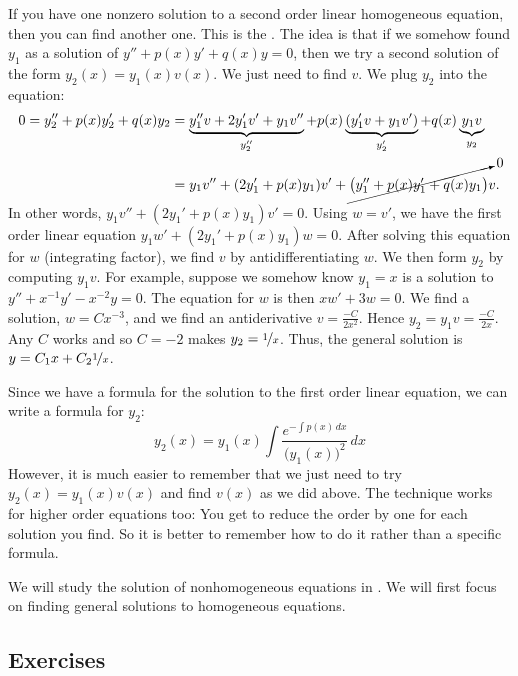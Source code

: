 If you have one nonzero solution to a second order linear homogeneous
equation, then you can find another one.  This is the \emph{}.  The idea is that if we somehow found $y_1$ as a solution of
$y'' + p(x) y' + q(x) y = 0$, then we try a second
solution of the form $y_2(x) = y_1(x) v(x)$.
We just need to find $v$.  We plug $y_2$ into the equation:
\begin{equation*}
\begin{split}
0 = 
y_2'' + p(x) y_2' + q(x) y_2
& =
\underbrace{y_1'' v + 2 y_1' v' + y_1 v''}_{y_2''}
+ p(x) \underbrace{( y_1' v + y_1 v' )}_{y_2'}
+ q(x) \underbrace{y_1 v}_{y_2}
\\
& =
y_1 v''
+ (2 y_1' + p(x) y_1) v'
+
\cancelto{0}{\bigl( y_1'' + p(x) y_1' + q(x) y_1 \bigr)} v .
\end{split}
\end{equation*}
In other words,
$y_1 v'' + (2 y_1' + p(x) y_1) v' = 0$.  Using $w = v'$, we have the
first order linear equation
$y_1 w' + (2 y_1' + p(x) y_1) w = 0$.  After solving this equation for $w$
(integrating factor),
we find $v$ by antidifferentiating $w$.  We then form $y_2$ by computing
$y_1 v$.  For example, suppose we somehow know $y_1 = x$ is a solution
to $y''+x^{-1}y'-x^{-2} y=0$.
The equation for $w$ is then
$xw' + 3 w = 0$.  We find a solution, $w = Cx^{-3}$, and we find an 
antiderivative $v = \frac{-C}{2x^2}$.
Hence $y_2 = y_1 v = \frac{-C}{2x}$.
Any $C$ works and so $C=-2$ makes $y_2 = \nicefrac{1}{x}$.  Thus, the
general solution is $y = C_1 x + C_2\nicefrac{1}{x}$.

Since we have a formula for the solution to the first order linear equation,
we can write a formula for $y_2$:
\begin{equation*}
y_2(x) = y_1(x) \int \frac{e^{-\int p(x)\,dx}}{{\bigl(y_1(x)\bigr)}^2} \,dx
\end{equation*}
However, it is much easier to remember that we just need to try $y_2(x) =
y_1(x) v(x)$ and find $v(x)$ as we did above.  The technique
works for higher order equations too: You get to reduce the order by one for each
solution you find.  So it is better to remember how to do
it rather than a specific formula.

\medskip

We will study the solution of nonhomogeneous equations in
.  We will first focus on finding general solutions to
homogeneous equations.


\subsection{Exercises}

